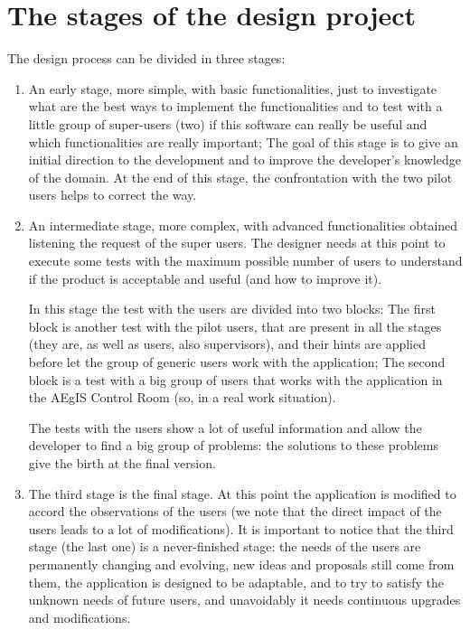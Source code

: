 \section{The stages of the design project}

The design process can be divided in three stages:

\begin{enumerate}

\item An early stage, more simple, with basic functionalities, just to investigate what are the best ways to implement the functionalities and to test with a little group of super-users (two) if this software can really be useful and which functionalities are really important; The goal of this stage is to give an initial direction to the development and to improve the developer's knowledge of the domain. At the end of this stage, the confrontation with the two pilot users helps to correct the way.

\item An intermediate stage, more complex, with advanced functionalities obtained listening the request of the super users.  
The designer needs at this point to execute some tests with the maximum possible number of users to understand if the product is acceptable and useful (and how to improve it). 

In this stage the test with the users are divided into two blocks:  
The first block is another test with the pilot users, that are present in all the stages (they are, as well as users, also supervisors), and their hints are applied before let the group of generic users work with the application;
The second block is a test with a big group of users that works with the application in the AEgIS Control Room (so, in a real work situation).

The tests with the users show a lot of useful information and allow the developer to find a big group of problems: the solutions to these problems give the birth at the final version. 

\item
The third stage is the final stage. At this point the application is modified to accord the observations of the users (we note that the direct impact of the users leads to a lot of modifications). It is important to notice that the third stage (the last one) is a never-finished stage: the needs of the users are permanently changing and evolving, new ideas and proposals still come from them, the application is designed to be adaptable, and to try to satisfy the unknown needs of future users, and unavoidably it needs continuous upgrades and modifications. 

\end{enumerate}


